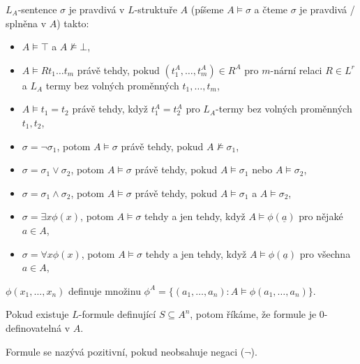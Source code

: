 \documentclass[12pt]{article}                   %
\begin{document}
        \begin{definice}
            $L_A$-sentence $\sigma$ je pravdivá v $L$-struktuře $A$ (píšeme $A \models \sigma$ a čteme $\sigma$ je pravdivá / splněna v $A$) takto:
            
            \begin{itemize}
                \item $A \models \top$ a $A \not\models \bot$,
                \item $A \models Rt_1…t_m$ právě tehdy, pokud $(t^A_1, …, t^A_m) \in R^A$ pro $m$-nární relaci $R \in L^r$ a $L_A$ termy bez volných proměnných $t_1, …, t_m$,
                \item $A \models t_1 = t_2$ právě tehdy, když $t_1^A = t_2^A$ pro $L_A$-termy bez volných proměnných $t_1, t_2$,
                \item $\sigma = \neg \sigma_1$, potom $A \models \sigma$ právě tehdy, pokud $A \not\models \sigma_1$,
                \item $\sigma = \sigma_1 \lor \sigma_2$, potom $A \models \sigma$ právě tehdy, pokud $A \models \sigma_1$ nebo $A \models \sigma_2$,
                \item $\sigma = \sigma_1 \land \sigma_2$, potom $A \models \sigma$ právě tehdy, pokud $A \models \sigma_1$ a $A \models \sigma_2$,
                \item $\sigma = \exists x \phi(x)$, potom $A \models \sigma$ tehdy a jen tehdy, když $A \models \phi(\underline{a})$ pro nějaké $a \in A$,
                \item $\sigma = \forall x \phi(x)$, potom $A \models \sigma$ tehdy a jen tehdy, když $A \models \phi(\underline{a})$ pro všechna $a \in A$,
            \end{itemize}
        \end{definice}

        \begin{definice}
            $\phi(x_1, …, x_n)$ definuje množinu $\phi^A = \{(a_1, …, a_n) : A \models \phi(a_1, …, a_n)\}$.

            Pokud existuje $L$-formule definující $S \subseteq A^n$, potom říkáme, že formule je 0-definovatelná v $A$.
        \end{definice}

        \begin{definice}
            Formule se nazývá pozitivní, pokud neobsahuje negaci ($\neg$).
        \end{definice}
\end{document}
